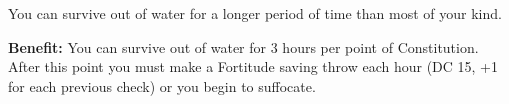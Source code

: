 
You can survive out of water for a longer period of time than most of your kind.

\textbf{Benefit:} You can survive out of water for 3 hours per point of Constitution. After this point you must make a Fortitude saving throw each hour (DC 15, +1 for each previous check) or you begin to suffocate.